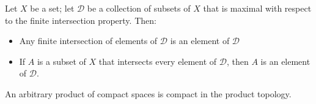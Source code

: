 \documentclass[12pt,a4paper]{article}
\begin{document}
    \begin{lemma}\label{4.8.2}
        Let $X$ be a set; let $\mathcal{D}$ be a collection of subsets of $X$ that is maximal with respect to the finite intersection property. Then:
        \begin{itemize}
            \item Any finite intersection of elements of $\mathcal{D}$ is an element of $\mathcal{D}$
            \item If $A$ is a subset of $X$ that intersects every element of $\mathcal{D}$, then $A$ is an element of $\mathcal{D}$.
        \end{itemize}
    \end{lemma}
    \hfill

    \begin{thm}
        An arbitrary product of compact spaces is compact in the product topology.
    \end{thm}
    \hfill
\end{document}
